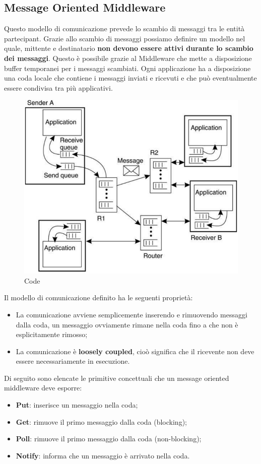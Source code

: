 \documentclass[12pt]{article}
\begin{document}
	\subsection{Message Oriented Middleware}
		Questo modello di comunicazione prevede lo scambio di messaggi tra le entità partecipant. Grazie allo scambio di messaggi possiamo definire un modello nel quale, mittente e destinatario \textbf{non devono essere attivi durante lo scambio dei messaggi}. Questo è possibile grazie al Middleware che mette a disposizione buffer temporanei per i messaggi scambiati. Ogni applicazione ha a disposizione una coda locale che contiene i messaggi inviati e ricevuti e che può eventualmente essere condivisa tra più applicativi.
		\begin{figure}[h!]
			\centering
			\includegraphics[scale=0.30]{img/queque.png}
			\caption{Code }
		\end{figure} 
		Il modello di comunicazione definito ha le seguenti proprietà:
		\begin{itemize}
			\item La comunicazione avviene semplicemente inserendo e rimuovendo messaggi dalla coda, un messaggio ovviamente rimane nella coda fino a che non è esplicitamente rimosso;
			\item La comunicazione è \textbf{loosely coupled}, cioò significa che il ricevente non deve essere necessariamente in esecuzione.   
		\end{itemize}
		Di seguito sono elencate le primitive concettuali che un message oriented middleware deve esporre:
		\begin{itemize}
			\item \textbf{Put}: inserisce un messaggio nella coda;
			\item \textbf{Get}: rimuove il primo messaggio dalla coda (blocking);
			\item \textbf{Poll}: rimuove il primo messaggio dalla coda (non-blocking);
			\item \textbf{Notify}: informa che un messaggio è arrivato nella coda.	
		\end{itemize}
		\newpage
		
\end{document}

